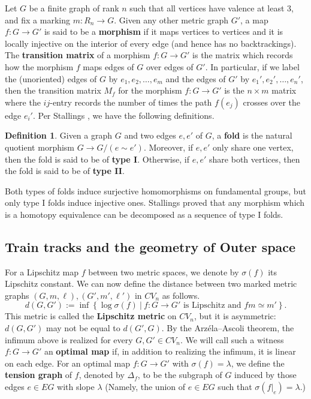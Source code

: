 \documentclass[11pt, letterpaper]{amsart}
\theoremstyle{plain}
\theoremstyle{definition}
\newtheorem{definition}[theorem]{Definition}
\begin{document}
Let $G$ be a finite graph of rank $n$ such that all vertices have valence at least 3,
and fix a marking $m: R_n\to G$. Given any other metric graph $G'$, a map $f:
G \to G'$ is said to be a \textbf{morphism} if it maps vertices to
vertices and it is locally injective on the
interior of every edge (and hence has no backtrackings). The \textbf{transition matrix}
of a morphism $f: G \to G'$ is the matrix which records how the morphism $f$ maps
edges of $G$ over edges of $G'$. In particular, if we label the (unoriented)
edges of $G$ by $e_1, e_2, \ldots, e_m$ and the edges of $G'$ by $e_1', e_2',
\ldots, e_n'$, then the transition matrix $M_f$ for the morphism $f: G \to G'$
is the $n \times m$ matrix where the $ij$-entry records the number of times the path
$f(e_j)$ crosses over the edge $e_i'$.
Per Stallings \cite{stallings1983topology}, we have the following definitions.
\begin{definition}
  Given a graph $G$ and two edges $e,e'$ of $G$, a \textbf{fold} is the natural
  quotient morphism $G \to G/(e \sim e')$. Moreover, if $e,e'$ only share one
  vertex, then the fold is said to be of \textbf{type I}. Otherwise, if $e,e'$
  share both vertices, then the fold is said to be of \textbf{type II}.
\end{definition}

Both types of folds induce surjective homomorphisms on fundamental groups, but only type I folds
induce injective ones. Stallings \cite[Algorithm 5.4]{stallings1983topology}
proved that any morphism which is a homotopy equivalence can be decomposed as a
sequence of type I folds. 

\subsection{Train tracks and the geometry of Outer space}
For a Lipschitz map $f$ between two metric spaces, we denote by $\sigma(f)$ its
Lipschitz constant. We can now define the distance between two marked
metric graphs $(G,m,\ell), (G',m',\ell')$ in $CV_n$ as follows.
\[
  d(G,G') := \inf \left\{\log \sigma(f)\ |\ f:G \to G' \text{ is Lipschitz and
    $f m \simeq m'$}\right\}.
\]
This metric is called the \textbf{Lipschitz metric} on $CV_n$, but it is asymmetric:
$d(G,G')$ may not be equal to $d(G',G)$.
By the Arz{\'e}la--Ascoli theorem, the infimum above is realized for every $G,G'
\in CV_n$. We will call such a witness $f: G \to G'$ an \textbf{optimal map}
if, in addition to realizing the infimum, it is linear on each edge. For an optimal
map $f: G \to G'$ with $\sigma(f)=\lambda$, 
we define the \textbf{tension graph} of $f$, denoted by $\Delta_f$, to be the subgraph of $G$ induced by those edges $e\in EG$ with slope $\lambda$
(Namely, the union of $e \in EG$ such that $\sigma(f|_e)=\lambda$.)
\end{document}

